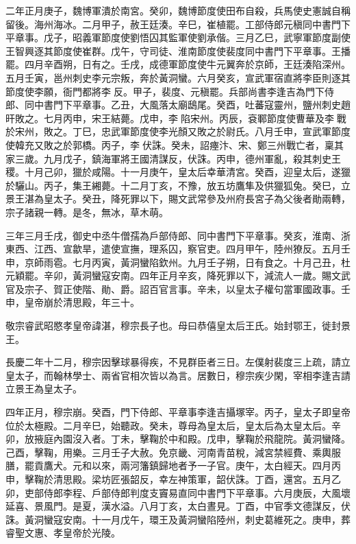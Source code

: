 \begin{pinyinscope}
 二年正月庚子，魏博軍潰於南宮。癸卯，魏博節度使田布自殺，兵馬使史憲誠自稱留後。海州海冰。二月甲子，赦王廷湊。辛巳，崔植罷。工部侍郎元稹同中書門下平章事。戊子，昭義軍節度使劉悟囚其監軍使劉承偕。三月乙巳，武寧軍節度副使王智興逐其節度使崔群。戊午，守司徒、淮南節度使裴度同中書門下平章事。王播罷。四月辛酉朔，日有之。壬戌，成德軍節度使牛元翼奔於京師，王廷湊陷深州。五月壬寅，邕州刺史李元宗叛，奔於黃洞蠻。六月癸亥，宣武軍宿直將李臣則逐其節度使李願，衙門都將李反。甲子，裴度、元稹罷。兵部尚書李逢吉為門下侍郎、同中書門下平章事。乙丑，大風落太廟鴟尾。癸酉，吐蕃寇靈州，鹽州刺史趙旰敗之。七月丙申，宋王結薨。戊申，李陷宋州。丙辰，袞鄆節度使曹華及李戰於宋州，敗之。丁巳，忠武軍節度使李光顏又敗之於尉氏。八月壬申，宣武軍節度使韓充又敗之於郭橋。丙子，李伏誅。癸未，詔瘞汴、宋、鄭三州戰亡者，稟其家三歲。九月戊子，鎮海軍將王國清謀反，伏誅。丙申，德州軍亂，殺其刺史王稷。十月己卯，獵於咸陽。十一月庚午，皇太后幸華清宮。癸酉，迎皇太后，遂獵於驪山。丙子，集王緗薨。十二月丁亥，不豫，放五坊鷹隼及供獵狐兔。癸巳，立景王湛為皇太子。癸丑，降死罪以下，賜文武常參及州府長宮子為父後者勛兩轉，宗子諸親一轉。是冬，無冰，草木萌。



 三年三月壬戌，御史中丞牛僧孺為戶部侍郎、同中書門下平章事。癸亥，淮南、浙東西、江西、宣歙旱，遣使宣撫，理系囚，察官吏。四月甲午，陸州獠反。五月壬申，京師雨雹。七月丙寅，黃洞蠻陷欽州。九月壬子朔，日有食之。十月己丑，杜元穎罷。辛卯，黃洞蠻寇安南。四年正月辛亥，降死罪以下，減流人一歲。賜文武官及宗子、賀正使階、勛、爵。詔百官言事。辛未，以皇太子權句當軍國政事。壬申，皇帝崩於清思殿，年三十。



 敬宗睿武昭愍孝皇帝諱湛，穆宗長子也。母曰恭僖皇太后王氏。始封鄂王，徙封景王。



 長慶二年十二月，穆宗因擊球暴得疾，不見群臣者三日。左僕射裴度三上疏，請立皇太子，而翰林學士、兩省官相次皆以為言。居數日，穆宗疾少閑，宰相李逢吉請立景王為皇太子。



 四年正月，穆宗崩。癸酉，門下侍郎、平章事李逢吉攝塚宰。丙子，皇太子即皇帝位於太極殿。二月辛巳，始聽政。癸未，尊母為皇太后，皇太后為太皇太后。辛卯，放掖庭內園沒入者。丁未，擊鞠於中和殿。戊申，擊鞠於飛龍院。黃洞蠻降。己酉，擊鞠，用樂。三月壬子大赦。免京畿、河南青苗稅，減宮禁經費、乘輿服膳，罷貢鷹犬。元和以來，兩河籓鎮歸地者予一子官。庚午，太白經天。四月丙申，擊鞠於清思殿。梁坊匠張韶反，幸左神策軍，韶伏誅。丁酉，還宮。五月乙卯，吏部侍郎李程、戶部侍郎判度支竇易直同中書門下平章事。六月庚辰，大風壞延喜、景風門。是夏，漢水溢。八月丁亥，太白晝見。丁酉，中官季文德謀反，伏誅。黃洞蠻寇安南。十一月戊午，環王及黃洞蠻陷陸州，刺史葛維死之。庚申，葬睿聖文惠、孝皇帝於光陵。




\end{pinyinscope}
